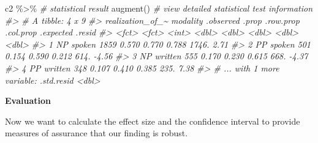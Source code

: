 \documentclass[
]{article}
\newenvironment{Shaded}{\begin{snugshade}}{\end{snugshade}}
\newcommand{\CommentTok}[1]{\textcolor[rgb]{0.56,0.35,0.01}{\textit{#1}}}
\newcommand{\FunctionTok}[1]{\textcolor[rgb]{0.00,0.00,0.00}{#1}}
\newcommand{\NormalTok}[1]{#1}
\newcommand{\OtherTok}[1]{\textcolor[rgb]{0.56,0.35,0.01}{#1}}
\newcommand{\SpecialCharTok}[1]{\textcolor[rgb]{0.00,0.00,0.00}{#1}}
\begin{document}
\begin{Shaded}
\begin{Highlighting}[]
\NormalTok{c2 }\SpecialCharTok{\%\textgreater{}\%} \CommentTok{\# statistical result}
  \FunctionTok{augment}\NormalTok{() }\CommentTok{\# view detailed statistical test information}
\CommentTok{\#\textgreater{} \# A tibble: 4 x 9}
\CommentTok{\#\textgreater{}   realization\_of\_\textasciitilde{} modality .observed .prop .row.prop .col.prop .expected .resid}
\CommentTok{\#\textgreater{}   \textless{}fct\textgreater{}            \textless{}fct\textgreater{}        \textless{}int\textgreater{} \textless{}dbl\textgreater{}     \textless{}dbl\textgreater{}     \textless{}dbl\textgreater{}     \textless{}dbl\textgreater{}  \textless{}dbl\textgreater{}}
\CommentTok{\#\textgreater{} 1 NP               spoken        1859 0.570     0.770     0.788     1746.   2.71}
\CommentTok{\#\textgreater{} 2 PP               spoken         501 0.154     0.590     0.212      614.  {-}4.56}
\CommentTok{\#\textgreater{} 3 NP               written        555 0.170     0.230     0.615      668.  {-}4.37}
\CommentTok{\#\textgreater{} 4 PP               written        348 0.107     0.410     0.385      235.   7.38}
\CommentTok{\#\textgreater{} \# ... with 1 more variable: .std.resid \textless{}dbl\textgreater{}}
\end{Highlighting}
\end{Shaded}

\textbf{Evaluation}

Now we want to calculate the effect size and the confidence interval to provide measures of assurance that our finding is robust.

\begin{Shaded}
\end{Shaded}
\end{document}
